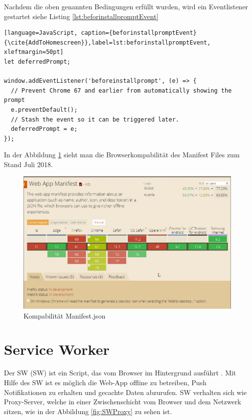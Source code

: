 \newpage
Nachdem die oben genannten Bedingungen erfüllt wurden, wird ein Eventlistener gestartet siehe Listing \ref{lst:beforinstallpromptEvent}


\begin{lstlisting}[language=JavaScript, caption={beforinstallpromptEvent} {\cite{AddToHomescreen}},label=lst:beforinstallpromptEvent, xleftmargin=50pt]
let deferredPrompt;

window.addEventListener('beforeinstallprompt', (e) => {
  // Prevent Chrome 67 and earlier from automatically showing the prompt
  e.preventDefault();
  // Stash the event so it can be triggered later.
  deferredPrompt = e;
});
\end{lstlisting}

In der Abbildung \ref{fig:BrowserManifest} sieht man die Browserkompabilität des Manifest Files zum Stand Juli 2018.
 
\begin{figure}[h]
	\centering
	\includegraphics[width=16cm]{BilderAllgemein/BrowserManifest}\medskip
	\caption{Kompabilität Manifest.json \cite{BrowserSupport}}
	\label{fig:BrowserManifest}
\end{figure}
 

\newpage
\section{Service Worker}
Der \acl{SW} (\acs{SW}) ist ein Script, das vom Browser im Hintergrund ausführt \cite{ServiceWorkerRegistration}. Mit Hilfe des \acs{SW} ist es möglich die \acs{Web-App} offline zu betreiben, Push Notifikationen zu erhalten und gecachte Daten abzurufen. \acs{SW} verhalten sich wie Proxy-Server, welche in einer Zwischenschicht vom Browser und dem Netzwerk sitzen, wie in der Abbildung \ref{fig:SWProxy} zu sehen ist.


